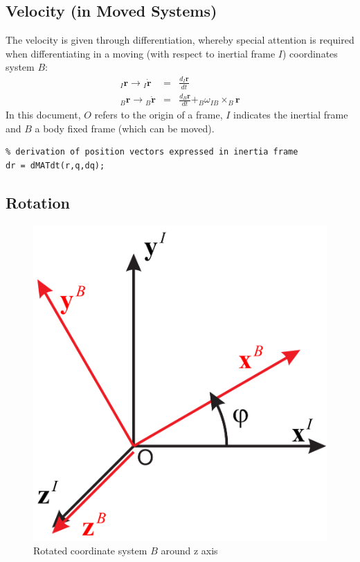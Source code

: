 \subsection{Velocity (in Moved Systems)}\label{sec:velocity}
The velocity is given through differentiation, whereby special attention is required when differentiating in a moving (with respect to inertial frame $I$) coordinates system $B$:
\begin{eqnarray}
_I\mathbf{r} \rightarrow {}_I\dot{\mathbf{r}} &=& \frac{d{}_I\mathbf{r}}{dt} \\
_B\mathbf{r} \rightarrow {}_B\dot{\mathbf{r}} &=& \frac{d{}_B\mathbf{r}}{dt} + _B\omega_{IB} \times _B\mathbf{r}
\end{eqnarray}
In this document, $O$ refers to the origin of a frame, $I$ indicates the inertial frame and $B$ a body fixed frame (which can be moved).
\\



\begin{lstlisting}
% derivation of position vectors expressed in inertia frame
dr = dMATdt(r,q,dq);
\end{lstlisting}

\subsection{Rotation}
\begin{figure}[H]
	\centering
		\includegraphics[width=.500\textwidth]{pics/movedCS.pdf}
	\caption{Rotated coordinate system $B$ around z axis}
	\label{fig:movedCS}
\end{figure}

